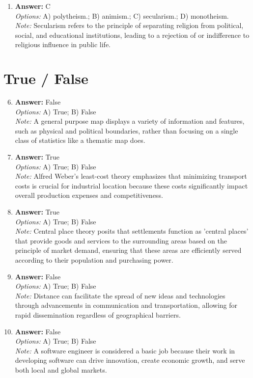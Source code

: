 \documentclass[12pt]{article}
\begin{document}
\begin{enumerate}[label=\arabic*.]
\\ \textit{Note:} Immigrants in Europe often face socioeconomic barriers and discrimination, which can lead to their concentration in specific neighborhoods, commonly referred to as ethnic enclaves.
\item \textbf{Answer:} C
\\ \textit{Options:} A) polytheism.; B) animism.; C) secularism.; D) monotheism.
\\ \textit{Note:} Secularism refers to the principle of separating religion from political, social, and educational institutions, leading to a rejection of or indifference to religious influence in public life.
\end{enumerate}

\section*{True / False}
\begin{enumerate}[label=\arabic*.]
\setcounter{enumi}{5}
\item \textbf{Answer:} False
\\ \textit{Options:} A) True; B) False
\\ \textit{Note:} A general purpose map displays a variety of information and features, such as physical and political boundaries, rather than focusing on a single class of statistics like a thematic map does.
\item \textbf{Answer:} True
\\ \textit{Options:} A) True; B) False
\\ \textit{Note:} Alfred Weber's least-cost theory emphasizes that minimizing transport costs is crucial for industrial location because these costs significantly impact overall production expenses and competitiveness.
\item \textbf{Answer:} True
\\ \textit{Options:} A) True; B) False
\\ \textit{Note:} Central place theory posits that settlements function as 'central places' that provide goods and services to the surrounding areas based on the principle of market demand, ensuring that these areas are efficiently served according to their population and purchasing power.
\item \textbf{Answer:} False
\\ \textit{Options:} A) True; B) False
\\ \textit{Note:} Distance can facilitate the spread of new ideas and technologies through advancements in communication and transportation, allowing for rapid dissemination regardless of geographical barriers.
\item \textbf{Answer:} False
\\ \textit{Options:} A) True; B) False
\\ \textit{Note:} A software engineer is considered a basic job because their work in developing software can drive innovation, create economic growth, and serve both local and global markets.
\end{enumerate}
\end{document}
